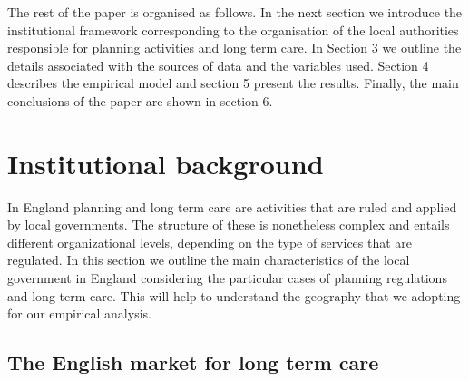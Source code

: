 \documentclass[11pt,a4paper,]{article}
\begin{document}
The rest of the paper is organised as follows. In the next section we
introduce the institutional framework corresponding to the organisation
of the local authorities responsible for planning activities and long
term care. In Section 3 we outline the details associated with the
sources of data and the variables used. Section 4 describes the
empirical model and section 5 present the results. Finally, the main
conclusions of the paper are shown in section 6.

\section{Institutional background}\label{institutional-background}

In England planning and long term care are activities that are ruled and
applied by local governments. The structure of these is nonetheless
complex and entails different organizational levels, depending on the
type of services that are regulated. In this section we outline the main
characteristics of the local government in England considering the
particular cases of planning regulations and long term care. This will
help to understand the geography that we adopting for our empirical
analysis.

\subsection{The English market for long term
care}\label{the-english-market-for-long-term-care}

\printbibliography
\end{document}
